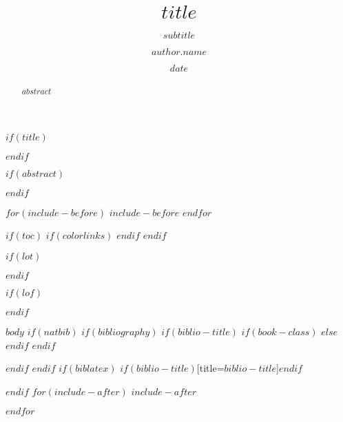 \documentclass[%
$if(fontsize)$
  $fontsize$,
$endif$
$if(lang)$
  $babel-lang$,
$endif$
numbers=noendperiod,
bibliography=totoc,
$if(papersize)$
  $papersize$paper,
$endif$
$if(fontsize)$
  $fontsize$,
$endif$
$for(classoption)$$classoption$$sep$,$endfor$,
]{scrartcl}
\title{$title$}
\subtitle{$subtitle$}
\author[$author.id$]{$author.name$}
\affil[$affil.id$]{$affil.name$}
\date{$date$}
\begin{document}
$if(title)$
\maketitle
$endif$

$if(abstract)$
\begin{abstract}
$abstract$
\end{abstract}
$endif$

$for(include-before)$
$include-before$
$endfor$

$if(toc)$
$if(colorlinks)$
\hypersetup{linkcolor=$if(toccolor)$$toccolor$$else$black$endif$}
$endif$
\setcounter{tocdepth}{$toc-depth$}
\tableofcontents
$endif$

$if(lot)$
\listoftables
$endif$

$if(lof)$
\listoffigures
$endif$

$body$
$if(natbib)$
$if(bibliography)$
$if(biblio-title)$
$if(book-class)$
\renewcommand\bibname{$biblio-title$}
$else$
\renewcommand\refname{$biblio-title$}
$endif$
$endif$
  

$endif$
$endif$
$if(biblatex)$
\printbibliography$if(biblio-title)$[title=$biblio-title$]$endif$

$endif$
$for(include-after)$
$include-after$

$endfor$
\end{document}
